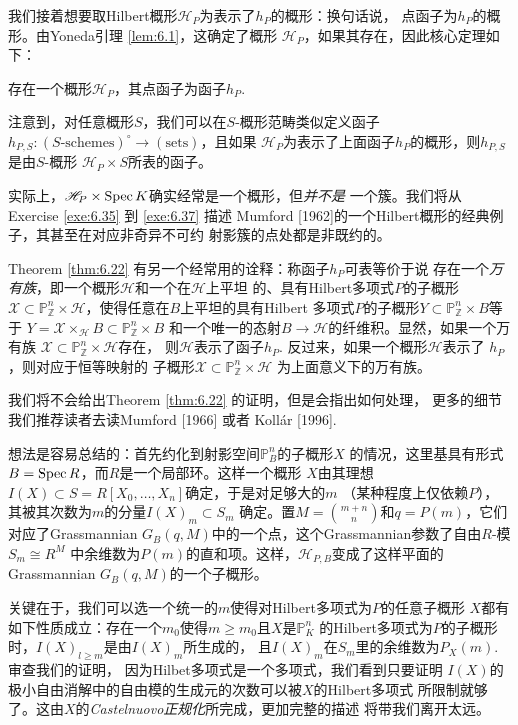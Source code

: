 我们接着想要取Hilbert概形$\mathscr H_P$为表示了$h_P$的概形：换句话说，
点函子为$h_P$的概形。由Yoneda引理 \eqref{lem:6.1}，这确定了概形
$\mathscr H_P$，如果其存在，因此核心定理如下：


\begin{thm}\label{thm:6.22}
存在一个概形$\mathscr H_P$，其点函子为函子$h_P$.
\end{thm}

注意到，对任意概形$S$，我们可以在$S$-概形范畴类似定义函子
$h_{P,S}:(\text{$S$-schemes})^\circ \to (\text{sets})$，且如果
$\mathscr H_P$为表示了上面函子$h_P$的概形，则$h_{P,S}$是由$S$-概形
$\mathscr H_P\times S$所表的函子。

实际上，$\mathscr H_P\times \operatorname{Spec} K$确实经常是一个概形，但\emph{并不是}
一个簇。我们将从 Exercise \ref{exe:6.35} 到 \ref{exe:6.37} 描述
Mumford [1962]的一个Hilbert概形的经典例子，其甚至在对应非奇异不可约
射影簇的点处都是非既约的。

Theorem \ref{thm:6.22} 有另一个经常用的诠释：称函子$h_P$可表等价于说
存在一个\emph{万有族}，即一个概形$\mathscr H$和一个在$\mathscr H$上平坦
的、具有Hilbert多项式$P$的子概形$\mathscr X\subset \mathbb 
P_{\mathbb Z}^n\times \mathscr H$，使得任意在$B$上平坦的具有Hilbert
多项式$P$的子概形$Y\subset \mathbb P_{\mathbb Z}^n\times B$等于
$Y=\mathscr X\times_{\mathscr H}B\subset \mathbb P_{\mathbb Z}^n\times B$
和一个唯一的态射$B\to \mathscr H$的纤维积。显然，如果一个万有族
$\mathscr X\subset \mathbb P_{\mathbb Z}^n\times \mathscr H$存在，
则$\mathscr H$表示了函子$h_P$. 反过来，如果一个概形$\mathscr H$表示了
$h_P$，则对应于恒等映射的
子概形$\mathscr X\subset \mathbb P_{\mathbb Z}^n \times \mathscr H$
为上面意义下的万有族。

我们将不会给出Theorem \ref{thm:6.22} 的证明，但是会指出如何处理，
更多的细节我们推荐读者去读Mumford [1966] 或者 Koll\'ar [1996].

想法是容易总结的：首先约化到射影空间$\mathbb P_B^n$的子概形$X$
的情况，这里基具有形式$B=\operatorname{Spec} R$，而$R$是一个局部环。这样一个概形
$X$由其理想$I(X)\subset S=R[X_0,\dots,X_n]$确定，于是对足够大的$m$
（某种程度上仅依赖$P$），其被其次数为$m$的分量$I(X)_m\subset S_m$
确定。置$M={{m+n}\choose n}$和$q=P(m)$，它们对应了Grassmannian
$G_B(q,M)$中的一个点，这个Grassmannian参数了自由$R$-模$S_m\cong R^M$
中余维数为$P(m)$的直和项。这样，$\mathscr H_{P,B}$变成了这样平面的
Grassmannian $G_B(q,M)$的一个子概形。

关键在于，我们可以选一个统一的$m$使得对Hilbert多项式为$P$的任意子概形
$X$都有如下性质成立：存在一个$m_0$使得$m\geq m_0$且$X$是$\mathbb P_K^n$
的Hilbert多项式为$P$的子概形时，$I(X)_{l\geq m}$是由$I(X)_m$所生成的，
且$I(X)_m$在$S_m$里的余维数为$P_X(m)$. 审查我们的证明，
因为Hilbet多项式是一个多项式，我们看到只要证明
$I(X)$的极小自由消解中的自由模的生成元的次数可以被$X$的Hilbert多项式
所限制就够了。这由$X$的\emph{Castelnuovo正规化}所完成，更加完整的描述
将带我们离开太远。

